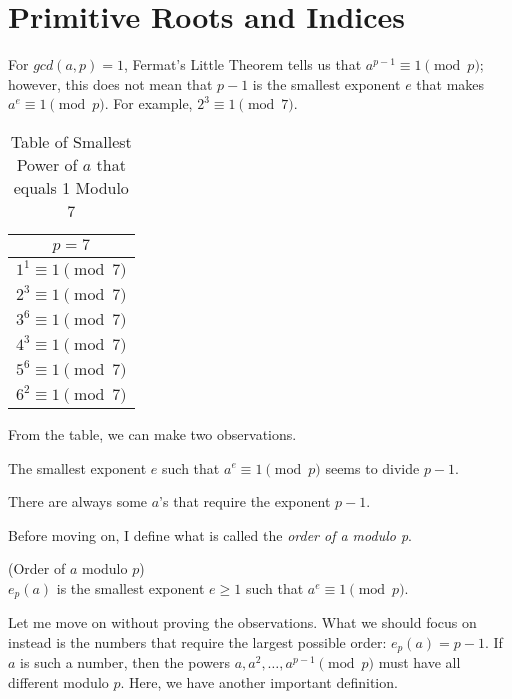 \section{Primitive Roots and Indices}

For $gcd(a, p) = 1$, Fermat's Little Theorem tells us that $a^{p - 1}\equiv 1\pmod{p}$; however, this does not mean that $p - 1$ is the smallest exponent $e$ that makes $a^{e}\equiv 1\pmod{p}$. For example, $2^{3}\equiv 1\pmod{7}$. 

\begin{table}[h!]
\centering
\begin{tabular}{|c|} 
  \hline
  $p = 7$ \\
  \hline \hline
  $1^{1}\equiv 1\pmod{7}$ \\
  \hline
  $2^{3}\equiv 1\pmod{7}$ \\
  \hline
  $3^{6}\equiv 1\pmod{7}$ \\
  \hline
  $4^{3}\equiv 1\pmod{7}$ \\
  \hline
  $5^{6}\equiv 1\pmod{7}$ \\
  \hline
  $6^{2}\equiv 1\pmod{7}$ \\
  \hline
\end{tabular}
\caption{Table of Smallest Power of $a$ that equals 1 Modulo 7}
\end{table}

\noindent
From the table, we can make two observations.

\begin{observation}
  The smallest exponent $e$ such that $a^{e}\equiv 1\pmod{p}$ seems to divide $p - 1$.
\end{observation}

\begin{observation}
  There are always some $a$'s that require the exponent $p - 1$.
\end{observation}

\noindent
Before moving on, I define what is called the \textit{order of a modulo p}.

\begin{definition}
(Order of $a$ modulo $p$) \\
$e_{p}(a)$ is the smallest exponent $e\geq 1$ such that $a^{e}\equiv 1\pmod{p}$.
\end{definition}

\noindent
Let me move on without proving the observations. What we should focus on instead is the numbers that require the largest possible order: $e_{p}(a) = p - 1$. If $a$ is such a number, then the powers $a, a^{2},\dots, a^{p - 1}\pmod{p}$ must have all different modulo $p$. Here, we have another important definition.

